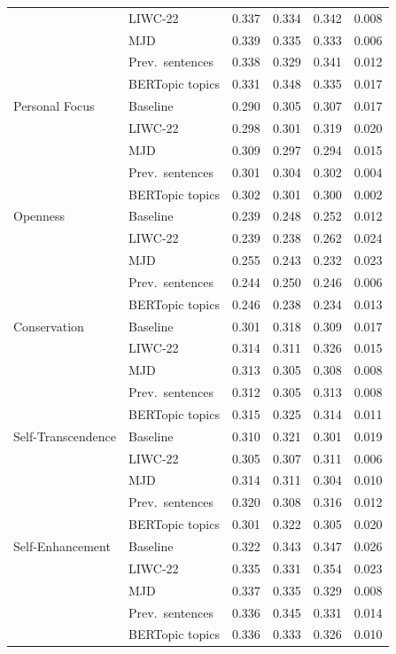 {\begin{longtable}{llcccc}
 & LIWC-22 & 0.337 & 0.334 & 0.342 & 0.008 \\
 & MJD & 0.339 & 0.335 & 0.333 & 0.006 \\
 & Prev.\ sentences & 0.338 & 0.329 & 0.341 & 0.012 \\
 & BERTopic topics & 0.331 & 0.348 & 0.335 & 0.017 \\
Personal Focus & Baseline & 0.290 & 0.305 & 0.307 & 0.017 \\
 & LIWC-22 & 0.298 & 0.301 & 0.319 & 0.020 \\
 & MJD & 0.309 & 0.297 & 0.294 & 0.015 \\
 & Prev.\ sentences & 0.301 & 0.304 & 0.302 & 0.004 \\
 & BERTopic topics & 0.302 & 0.301 & 0.300 & 0.002 \\
Openness & Baseline & 0.239 & 0.248 & 0.252 & 0.012 \\
 & LIWC-22 & 0.239 & 0.238 & 0.262 & 0.024 \\
 & MJD & 0.255 & 0.243 & 0.232 & 0.023 \\
 & Prev.\ sentences & 0.244 & 0.250 & 0.246 & 0.006 \\
 & BERTopic topics & 0.246 & 0.238 & 0.234 & 0.013 \\
Conservation & Baseline & 0.301 & 0.318 & 0.309 & 0.017 \\
 & LIWC-22 & 0.314 & 0.311 & 0.326 & 0.015 \\
 & MJD & 0.313 & 0.305 & 0.308 & 0.008 \\
 & Prev.\ sentences & 0.312 & 0.305 & 0.313 & 0.008 \\
 & BERTopic topics & 0.315 & 0.325 & 0.314 & 0.011 \\
Self-Transcendence & Baseline & 0.310 & 0.321 & 0.301 & 0.019 \\
 & LIWC-22 & 0.305 & 0.307 & 0.311 & 0.006 \\
 & MJD & 0.314 & 0.311 & 0.304 & 0.010 \\
 & Prev.\ sentences & 0.320 & 0.308 & 0.316 & 0.012 \\
 & BERTopic topics & 0.301 & 0.322 & 0.305 & 0.020 \\
Self-Enhancement & Baseline & 0.322 & 0.343 & 0.347 & 0.026 \\
 & LIWC-22 & 0.335 & 0.331 & 0.354 & 0.023 \\
 & MJD & 0.337 & 0.335 & 0.329 & 0.008 \\
 & Prev.\ sentences & 0.336 & 0.345 & 0.331 & 0.014 \\
 & BERTopic topics & 0.336 & 0.333 & 0.326 & 0.010 \\
\end{longtable}
}

